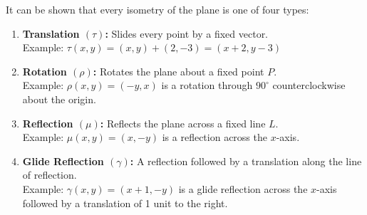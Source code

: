 It can be shown that every isometry of the plane is one of four types:
\begin{enumerate}
    \item \textbf{Translation $(\tau)$:} Slides every point by a fixed vector. \\
        Example: $\tau(x,y) = (x,y) + (2,-3) = (x+2,y-3)$
    \item \textbf{Rotation $(\rho)$:} Rotates the plane about a fixed point $P$. \\
        Example: $\rho(x,y) = (-y,x)$ is a rotation through $90^{\circ}$ counterclockwise about the origin.
    \item \textbf{Reflection $(\mu)$:} Reflects the plane across a fixed line $L$. \\
        Example: $\mu(x,y) = (x,-y)$ is a reflection across the $x$-axis.
    \item \textbf{Glide Reflection $(\gamma)$:} A reflection followed by a translation along the line of reflection. \\
        Example: $\gamma(x,y) = (x+1,-y)$ is a glide reflection across the $x$-axis followed by a translation of 1 unit to the right.
\end{enumerate}

